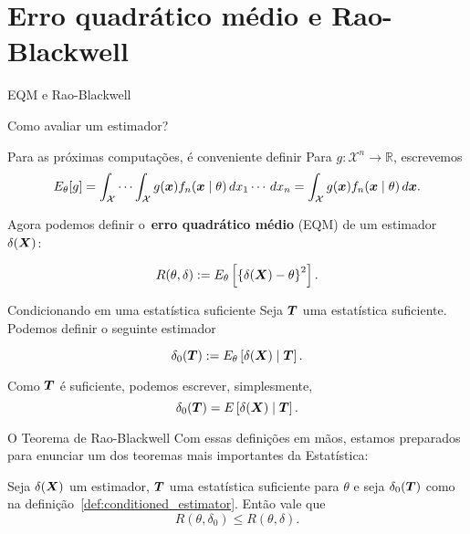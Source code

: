 \section*{Erro quadrático médio e Rao-Blackwell}
\begin{frame}{EQM e Rao-Blackwell}

Como avaliar um estimador?

\begin{defn}
Para as próximas computações, é conveniente definir
Para $g : \mathcal{X}^n \to \mathbb{R}$, escrevemos
\[ E_{\theta} [g] = \int_{\mathcal{X}} \cdots \int_{\mathcal{X}} g(\boldsymbol{x})f_n(\boldsymbol{x} \mid \theta)\, dx_1\cdots\,dx_n = \int_{\mathcal{X}} g(\boldsymbol{x})f_n(\boldsymbol{x} \mid \theta) \,d\boldsymbol{x}. \] 
\end{defn}

Agora podemos definir o~\textbf{erro quadrático médio} (EQM) de um estimador $\delta(\boldsymbol{X})$:
\begin{defn}
 \label{def:MSE}
 \begin{equation*}
  R(\theta, \delta) := E_{\theta} \left[\left\{\delta(\boldsymbol{X}) - \theta\right\}^2\right].
 \end{equation*}
\end{defn} 
\end{frame}

\begin{frame}{Condicionando em uma estatística suficiente}
 Seja $\boldsymbol{T}$ uma estatística suficiente.
 Podemos definir o seguinte estimador
 \begin{defn}
 \begin{equation*}
 \label{def:conditioned_estimator}
  \delta_0(\boldsymbol{T}) := E_{\theta} \left[ \delta(\boldsymbol{X}) \mid \boldsymbol{T} \right].
 \end{equation*}  
 \end{defn}
 Como $\boldsymbol{T}$ é suficiente, podemos escrever, simplesmente,
  \begin{equation*}
  \delta_0(\boldsymbol{T}) = E \left[ \delta(\boldsymbol{X}) \mid \boldsymbol{T} \right].
 \end{equation*}  
\end{frame}

\begin{frame}{O Teorema de Rao-Blackwell}
 Com essas definições em mãos, estamos preparados para enunciar um dos teoremas mais importantes da Estatística:
 \begin{theo}
  \label{thm:Rao-Blackwell}
  Seja $\delta(\boldsymbol{X})$ um estimador, $\boldsymbol{T}$ uma estatística suficiente para $\theta$ e seja $\delta_0(\boldsymbol{T})$ como na definição~\ref{def:conditioned_estimator}. 
  Então vale que
  \begin{equation*}
   R(\theta, \delta_0) \leq R(\theta, \delta).
  \end{equation*}
 \end{theo}
\end{frame}

